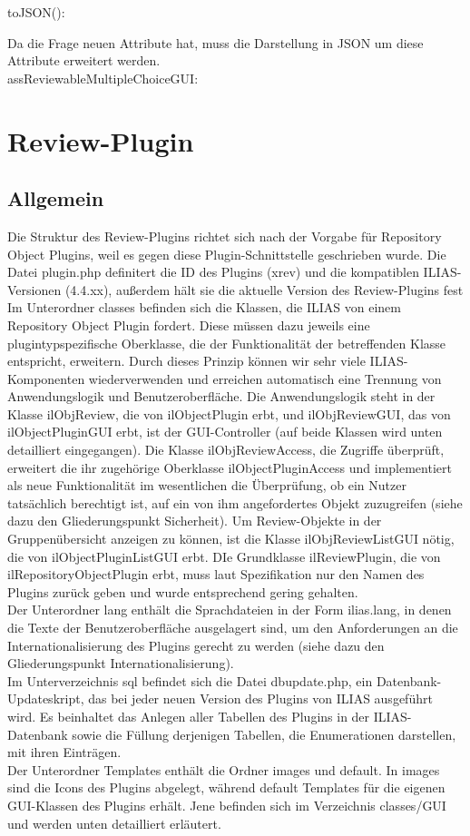 \documentclass[a4paper]{scrreprt}
\begin{document}
toJSON():

Da die Frage neuen Attribute hat, muss die Darstellung in JSON um diese Attribute erweitert werden.\\

assReviewableMultipleChoiceGUI:

\section{Review-Plugin}
\subsection{Allgemein}
Die Struktur des Review-Plugins richtet sich nach der Vorgabe für Repository Object Plugins, weil es gegen diese Plugin-Schnittstelle geschrieben wurde. Die Datei plugin.php definitert die ID des Plugins (xrev) und die kompatiblen ILIAS-Versionen (4.4.xx), außerdem hält sie die aktuelle Version des Review-Plugins fest\\
Im Unterordner classes befinden sich die Klassen, die ILIAS von einem Repository Object Plugin fordert. Diese müssen dazu jeweils eine plugintypspezifische Oberklasse, die der Funktionalität der betreffenden Klasse entspricht, erweitern. Durch dieses Prinzip können wir sehr viele ILIAS-Komponenten wiederverwenden und erreichen automatisch eine Trennung von Anwendungslogik und Benutzeroberfläche. Die Anwendungslogik steht in der Klasse ilObjReview, die von ilObjectPlugin erbt, und ilObjReviewGUI, das von ilObjectPluginGUI erbt, ist der GUI-Controller (auf beide Klassen wird unten detailliert eingegangen). Die Klasse ilObjReviewAccess, die Zugriffe überprüft, erweitert die ihr zugehörige Oberklasse ilObjectPluginAccess und implementiert als neue Funktionalität im wesentlichen die Überprüfung, ob ein Nutzer tatsächlich berechtigt ist, auf ein von ihm angefordertes Objekt zuzugreifen (siehe dazu den Gliederungspunkt Sicherheit). Um Review-Objekte in der Gruppenübersicht anzeigen zu können, ist die Klasse ilObjReviewListGUI nötig, die von ilObjectPluginListGUI erbt. DIe Grundklasse ilReviewPlugin, die von ilRepositoryObjectPlugin erbt, muss laut Spezifikation nur den Namen des Plugins zurück geben und wurde entsprechend gering gehalten.\\
Der Unterordner lang enthält die Sprachdateien in der Form ilias\textunderscore[Sprachkürzel].lang, in denen die Texte der Benutzeroberfläche ausgelagert sind, um den Anforderungen an die Internationalisierung des Plugins gerecht zu werden (siehe dazu den Gliederungspunkt Internationalisierung).\\
Im Unterverzeichnis sql befindet sich die Datei dbupdate.php, ein Datenbank-Updateskript, das bei jeder neuen Version des Plugins von ILIAS ausgeführt wird. Es beinhaltet das Anlegen aller Tabellen des Plugins in der ILIAS-Datenbank sowie die Füllung derjenigen Tabellen, die Enumerationen darstellen, mit ihren Einträgen.\\
Der Unterordner Templates enthält die Ordner images und default. In images sind die Icons des Plugins abgelegt, während default Templates für die eigenen GUI-Klassen des Plugins erhält. Jene befinden sich im Verzeichnis classes/GUI und werden unten detailliert erläutert.\\
\end{document}
